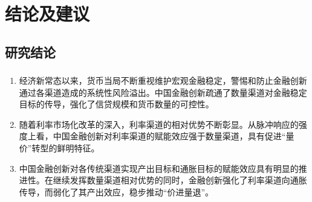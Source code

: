 \documentclass[12pt,aspectratio=169]{ctexbeamer}
\begin{document}
					
			\section{结论及建议}
			\subsection{研究结论}
			\begin{frame}[label=conclusion]
				\frametitle{}
				\begin{enumerate}
					\justifying
					\normalsize
					\item 经济新常态以来，货币当局不断重视维护宏观金融稳定，警惕和防止金融创新通过各渠道造成的系统性风险溢出。中国金融创新疏通了数量渠道对金融稳定目标的传导，强化了信贷规模和货币数量的可控性。
					\item 随着利率市场化改革的深入，利率渠道的相对优势不断彰显。从脉冲响应的强度上看，中国金融创新对利率渠道的赋能效应强于数量渠道，具有促进“量价”转型的鲜明特征。
					\item 中国金融创新对各传统渠道实现产出目标和通胀目标的赋能效应具有明显的推进性。在继续发挥数量渠道相对优势的同时，金融创新强化了利率渠道向通胀传导，而弱化了其产出效应，稳步推动“价进量退”。
					\hyperlink{pr}{\beamergotobutton{}}
				\end{enumerate}
			\end{frame}
\end{document}

